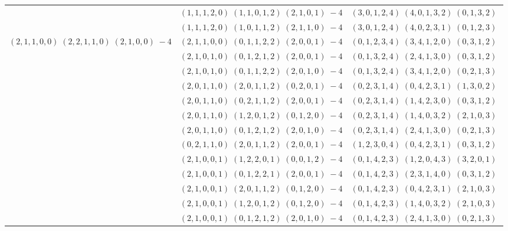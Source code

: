 \documentclass[11pt]{article}
\begin{document}
\begin{longtable}[l]{|c|c|c|}
 \cline{2-3} 
 & $(1 ,1 ,1 ,2 ,0) \;(1 ,1 ,0 ,1 ,2) \;(2 ,1 ,0 ,1) \;-4$ & $(3 ,0 ,1 ,2 ,4) \;(4 ,0 ,1 ,3 ,2) \;(0 ,1 ,3 ,2) \;$\\ 
 \cline{2-3} 
 & $(1 ,1 ,1 ,2 ,0) \;(1 ,0 ,1 ,1 ,2) \;(2 ,1 ,1 ,0) \;-4$ & $(3 ,0 ,1 ,2 ,4) \;(4 ,0 ,2 ,3 ,1) \;(0 ,1 ,2 ,3) \;$\\ \hline\multirow[t]{103}{*}{ $(2 ,1 ,1 ,0 ,0) \;(2 ,2 ,1 ,1 ,0) \;(2 ,1 ,0 ,0) \;-4$ }  & $(2 ,1 ,1 ,0 ,0) \;(0 ,1 ,1 ,2 ,2) \;(2 ,0 ,0 ,1) \;-4$ & $(0 ,1 ,2 ,3 ,4) \;(3 ,4 ,1 ,2 ,0) \;(0 ,3 ,1 ,2) \;$\\ 
 \cline{2-3} 
 & $(2 ,1 ,0 ,1 ,0) \;(0 ,1 ,2 ,1 ,2) \;(2 ,0 ,0 ,1) \;-4$ & $(0 ,1 ,3 ,2 ,4) \;(2 ,4 ,1 ,3 ,0) \;(0 ,3 ,1 ,2) \;$\\ 
 \cline{2-3} 
 & $(2 ,1 ,0 ,1 ,0) \;(0 ,1 ,1 ,2 ,2) \;(2 ,0 ,1 ,0) \;-4$ & $(0 ,1 ,3 ,2 ,4) \;(3 ,4 ,1 ,2 ,0) \;(0 ,2 ,1 ,3) \;$\\ 
 \cline{2-3} 
 & $(2 ,0 ,1 ,1 ,0) \;(2 ,0 ,1 ,1 ,2) \;(0 ,2 ,0 ,1) \;-4$ & $(0 ,2 ,3 ,1 ,4) \;(0 ,4 ,2 ,3 ,1) \;(1 ,3 ,0 ,2) \;$\\ 
 \cline{2-3} 
 & $(2 ,0 ,1 ,1 ,0) \;(0 ,2 ,1 ,1 ,2) \;(2 ,0 ,0 ,1) \;-4$ & $(0 ,2 ,3 ,1 ,4) \;(1 ,4 ,2 ,3 ,0) \;(0 ,3 ,1 ,2) \;$\\ 
 \cline{2-3} 
 & $(2 ,0 ,1 ,1 ,0) \;(1 ,2 ,0 ,1 ,2) \;(0 ,1 ,2 ,0) \;-4$ & $(0 ,2 ,3 ,1 ,4) \;(1 ,4 ,0 ,3 ,2) \;(2 ,1 ,0 ,3) \;$\\ 
 \cline{2-3} 
 & $(2 ,0 ,1 ,1 ,0) \;(0 ,1 ,2 ,1 ,2) \;(2 ,0 ,1 ,0) \;-4$ & $(0 ,2 ,3 ,1 ,4) \;(2 ,4 ,1 ,3 ,0) \;(0 ,2 ,1 ,3) \;$\\ 
 \cline{2-3} 
 & $(0 ,2 ,1 ,1 ,0) \;(2 ,0 ,1 ,1 ,2) \;(2 ,0 ,0 ,1) \;-4$ & $(1 ,2 ,3 ,0 ,4) \;(0 ,4 ,2 ,3 ,1) \;(0 ,3 ,1 ,2) \;$\\ 
 \cline{2-3} 
 & $(2 ,1 ,0 ,0 ,1) \;(1 ,2 ,2 ,0 ,1) \;(0 ,0 ,1 ,2) \;-4$ & $(0 ,1 ,4 ,2 ,3) \;(1 ,2 ,0 ,4 ,3) \;(3 ,2 ,0 ,1) \;$\\ 
 \cline{2-3} 
 & $(2 ,1 ,0 ,0 ,1) \;(0 ,1 ,2 ,2 ,1) \;(2 ,0 ,0 ,1) \;-4$ & $(0 ,1 ,4 ,2 ,3) \;(2 ,3 ,1 ,4 ,0) \;(0 ,3 ,1 ,2) \;$\\ 
 \cline{2-3} 
 & $(2 ,1 ,0 ,0 ,1) \;(2 ,0 ,1 ,1 ,2) \;(0 ,1 ,2 ,0) \;-4$ & $(0 ,1 ,4 ,2 ,3) \;(0 ,4 ,2 ,3 ,1) \;(2 ,1 ,0 ,3) \;$\\ 
 \cline{2-3} 
 & $(2 ,1 ,0 ,0 ,1) \;(1 ,2 ,0 ,1 ,2) \;(0 ,1 ,2 ,0) \;-4$ & $(0 ,1 ,4 ,2 ,3) \;(1 ,4 ,0 ,3 ,2) \;(2 ,1 ,0 ,3) \;$\\ 
 \cline{2-3} 
 & $(2 ,1 ,0 ,0 ,1) \;(0 ,1 ,2 ,1 ,2) \;(2 ,0 ,1 ,0) \;-4$ & $(0 ,1 ,4 ,2 ,3) \;(2 ,4 ,1 ,3 ,0) \;(0 ,2 ,1 ,3) \;$\\ 

\end{longtable}
\end{document}
